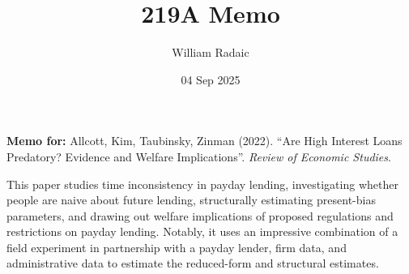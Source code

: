 \documentclass[english,12pt]{wr-memo}
\title{219A Memo}
\author{William Radaic}
\date{04 Sep 2025}
\begin{document}
\maketitle



\textbf{Memo for:} Allcott, Kim, Taubinsky, Zinman (2022). “Are High Interest Loans Predatory? Evidence and Welfare Implications”. \textit{Review of Economic Studies}.

\medskip 


This paper studies time inconsistency in payday lending, investigating whether people are naive about future lending, structurally estimating present-bias parameters, and drawing out welfare implications of proposed regulations and restrictions on payday lending.
Notably, it uses an impressive combination of a field experiment in partnership with a payday lender, firm data, and administrative data to estimate the reduced-form and structural estimates.


\clearpage 
\printbibliography[title={References}]
\end{document}
